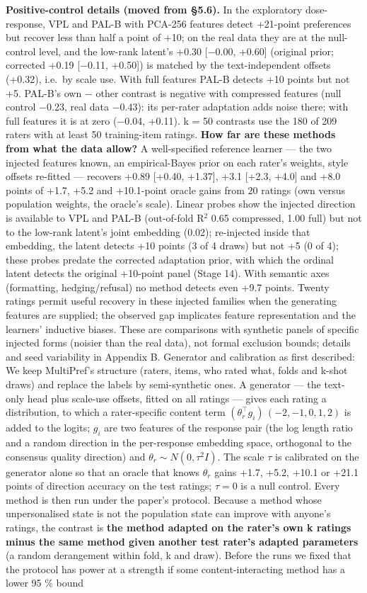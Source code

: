 \documentclass{article}
\begin{document}
\textbf{Positive-control details (moved from \S{}5.6).} In the exploratory dose-response, VPL and PAL-B with PCA-256 features detect +21-point preferences but recover less than half a point of +10; on the real data they are at the null-control level, and the low-rank latent's +0.30 {[}$-$0.00, +0.60{]} (original prior; corrected +0.19 {[}$-$0.11, +0.50{]}) is matched by the text-independent offsets (+0.32), i.e.~by scale use. With full features PAL-B detects +10 points but not +5. PAL-B's own $-$ other contrast is negative with compressed features (null control $-$0.23, real data $-$0.43): its per-rater adaptation adds noise there; with full features it is at zero ($-$0.04, +0.11). k = 50 contrasts use the 180 of 209 raters with at least 50 training-item ratings. \textbf{How far are these methods from what the data allow?} A well-specified reference learner --- the two injected features known, an empirical-Bayes prior on each rater's weights, style offsets re-fitted --- recovers +0.89 {[}+0.40, +1.37{]}, +3.1 {[}+2.3, +4.0{]} and +8.0 points of +1.7, +5.2 and +10.1-point oracle gains from 20 ratings (own versus population weights, the oracle's scale). Linear probes show the injected direction is available to VPL and PAL-B (out-of-fold R$^2$ 0.65 compressed, 1.00 full) but not to the low-rank latent's joint embedding (0.02); re-injected inside that embedding, the latent detects +10 points (3 of 4 draws) but not +5 (0 of 4); these probes predate the corrected adaptation prior, with which the ordinal latent detects the original +10-point panel (Stage 14). With semantic axes (formatting, hedging/refusal) no method detects even +9.7 points. Twenty ratings permit useful recovery in these injected families when the generating features are supplied; the observed gap implicates feature representation and the learners' inductive biases. These are comparisons with synthetic panels of specific injected forms (noisier than the real data), not formal exclusion bounds; details and seed variability in Appendix B. Generator and calibration as first described: We keep MultiPref's structure (raters, items, who rated what, folds and k-shot draws) and replace the labels by semi-synthetic ones. A generator --- the text-only head plus scale-use offsets, fitted on all ratings --- gives each rating a distribution, to which a rater-specific content term \((\theta_r^\top g_i)\,(-2,-1,0,1,2)\) is added to the logits; \(g_i\) are two features of the response pair (the log length ratio and a random direction in the per-response embedding space, orthogonal to the consensus quality direction) and \(\theta_r \sim N(0, \tau^2 I)\). The scale \(\tau\) is calibrated on the generator alone so that an oracle that knows \(\theta_r\) gains +1.7, +5.2, +10.1 or +21.1 points of direction accuracy on the test ratings; \(\tau = 0\) is a null control. Every method is then run under the paper's protocol. Because a method whose unpersonalised state is not the population state can improve with anyone's ratings, the contrast is \textbf{the method adapted on the rater's own k ratings minus the same method given another test rater's adapted parameters} (a random derangement within fold, k and draw). Before the runs we fixed that the protocol has power at a strength if some content-interacting method has a lower 95 \% bound 
\end{document}
